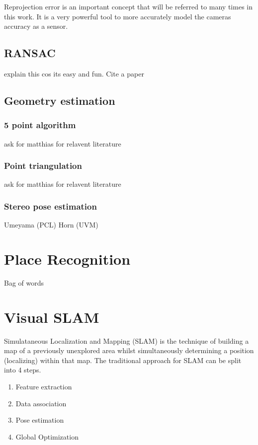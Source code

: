 Reprojection error is an important concept that will be referred to many times in this work.  It is a very powerful tool to more accurately model the cameras accuracy as a sensor.

\subsection{RANSAC}
\label{subsec:RANSAC}

explain this cos its easy and fun.  Cite a paper

\subsection{Geometry estimation}

\subsubsection{5 point algorithm}
\label{subsec:5point}
ask for matthias for relavent literature

\subsubsection{Point triangulation}

ask for matthias for relavent literature

\subsubsection{Stereo pose estimation}
\label{subsec:horn}

Umeyama (PCL) \newline 
Horn (UVM)


\section{Place Recognition}

Bag of words

\section{Visual SLAM}


Simulataneous Localization and Mapping (SLAM) is the technique of building a map of a previously
unexplored area whilst simultaneously determining a position (localizing) within that map.  The
traditional approach for SLAM can be split into 4 steps.
\begin{enumerate} \itemsep1pt \parskip0pt 
 \item Feature extraction
 \item Data association
 \item Pose estimation
 \item Global Optimization
\end{enumerate}

